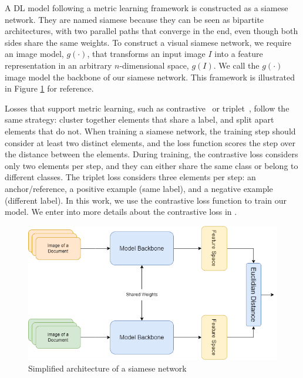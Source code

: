 A \gls{DL} model following a metric learning framework is constructed as a siamese network. They are named siamese because they can be seen as bipartite architectures, with two parallel paths that converge in the end, even though both sides share the same weights. To construct a visual siamese network, we require an image model, \( g(\cdot) \), that transforms an input image \( I \) into a feature representation in an arbitrary $n$-dimensional space, \( g(I) \). We call the  \( g(\cdot) \) image model the backbone of our siamese network. This framework is illustrated in Figure \ref{fig:siamese} for reference.

Losses that support metric learning, such as contrastive~\cite{chopra_learning_2005} or triplet~\cite{triplet}, follow the same strategy: cluster together elements that share a label, and split apart elements that do not. When training a siamese network, the training step should consider at least two distinct elements, and the loss function scores the step over the distance between the elements. During training, the contrastive loss considers only two elements per step, and they can either share the same class or belong to different classes. The triplet loss considers three elements per step: an anchor/reference, a positive example (same label), and a negative example (different label). In this work, we use the contrastive loss function to train our model. We enter into more details about the contrastive loss in .%


\begin{figure}[htbp]
\label{fig:siamese}
\centering
\includegraphics[width=0.9\linewidth]{images/siamese.png}
\caption{Simplified architecture of a siamese network}
\end{figure}

